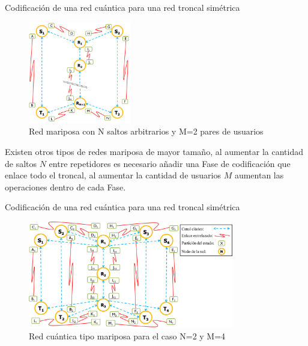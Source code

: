 \documentclass[10pt]{beamer}
\renewenvironment{block}[1]
    {\begin{oldblock}{#1}
        \smallskip
    }
    {
    \end{oldblock}
    }
\begin{document}
\begin{frame}{Codificación de una red cuántica para una red troncal simétrica}

  \begin{block}{}
    \vspace{-3cm}
    \begin{figure}
      \vspace{-15pt}
      \begin{center}
        \includegraphics[width=0.4\textwidth]{butterflynnnm22.png}
      \end{center}
      \vspace{-15pt}
      \caption{Red mariposa con N saltos arbitrarios y M=2 pares de usuarios}
    \end{figure}
    Existen otros tipos de redes mariposa de mayor tamaño, al aumentar la cantidad de saltos $N$ entre repetidores es necesario añadir una Fase de codificación que enlace todo el troncal, al aumentar la cantidad de usuarios $M$ aumentan las operaciones dentro de cada Fase.
  \end{block}
\end{frame}

\begin{frame}{Codificación de una red cuántica para una red troncal simétrica}
  \begin{block}{}
    \begin{figure}
      \includegraphics[width=0.8\textwidth]{butterflyn2m4.png}
      \caption{Red cuántica tipo mariposa para el caso N=2 y M=4}
    \end{figure}
  \end{block}
\end{frame}
\end{document}
